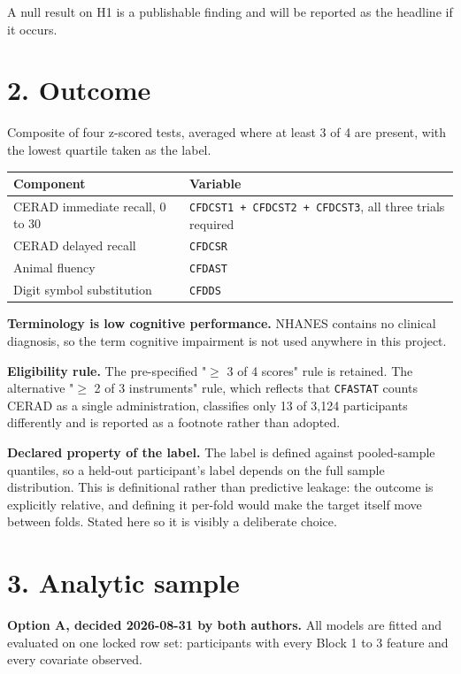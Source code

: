 \documentclass[11pt]{article}
\begin{document}
A null result on H1 is a publishable finding and will be reported as the headline if it occurs.

\section*{2. Outcome}

Composite of four z-scored tests, averaged where at least 3 of 4 are present, with the lowest quartile taken as the label.

\begin{longtable}{L{5cm}L{9cm}}
\toprule
Component & Variable \\
\midrule
\endhead
CERAD immediate recall, 0 to 30 & \texttt{CFDCST1 + CFDCST2 + CFDCST3}, all three trials required \\
CERAD delayed recall & \texttt{CFDCSR} \\
Animal fluency & \texttt{CFDAST} \\
Digit symbol substitution & \texttt{CFDDS} \\
\bottomrule
\end{longtable}

\textbf{Terminology is low cognitive performance.} NHANES contains no clinical diagnosis, so the term cognitive impairment is not used anywhere in this project.

\textbf{Eligibility rule.} The pre-specified "$\geq$ 3 of 4 scores" rule is retained. The alternative "$\geq$ 2 of 3 instruments" rule, which reflects that \texttt{CFASTAT} counts CERAD as a single administration, classifies only 13 of 3,124 participants differently and is reported as a footnote rather than adopted.

\textbf{Declared property of the label.} The label is defined against pooled-sample quantiles, so a held-out participant's label depends on the full sample distribution. This is definitional rather than predictive leakage: the outcome is explicitly relative, and defining it per-fold would make the target itself move between folds. Stated here so it is visibly a deliberate choice.

\section*{3. Analytic sample}

\textbf{Option A, decided 2026-08-31 by both authors.} All models are fitted and evaluated on one locked row set: participants with every Block 1 to 3 feature and every covariate observed.
\end{document}

